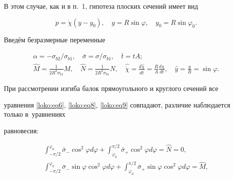 В этом случае, как и в п.~1, гипотеза плоских сечений имеет вид

\begin{equation}

\label{loko:eq11}

\dot {p}=\dot {\chi }(y-y_0),

\quad

y=R\sin \varphi,

\quad

y_0 =R\sin \varphi _0 .

\end{equation}

Введём безразмерные переменные

\begin{gather*}

\alpha =-{\sigma_{b2}}/{\sigma_{b1}}, \quad \bar {\sigma }={\sigma}/{\sigma_{b1}},

\quad \bar {t}=t A; \\

\hat {M}=\frac{1}{2R^3\sigma _{b1}} M, \quad

\hat {N}=\frac{1}{2R^2\sigma _{b1} } N,\quad 

\hat {\dot {\chi }}=\frac{d\hat {\chi }}{d\bar {t}}=\frac{R}{A}\frac{d\chi }{dt}, \quad \hat {y}=\frac{y}{R}=\sin \varphi.

\end{gather*}

При рассмотрении изгиба балок прямоугольного и круглого сечений все

уравнения \eqref{loko:eq6}, \eqref{loko:eq8}, \eqref{loko:eq9} совпадают, различие наблюдается только в~уравнениях

равновесия:

\begin{equation}

\label{loko:eq13}

\begin{array}{l}

\displaystyle

\int_{-\pi /2}^{\varphi _0} \bar {\sigma}_- \cos^2\varphi d\varphi +

\int_{\varphi _0}^{\pi /2} \bar {\sigma }_+ \cos^2\varphi d\varphi =\hat {N}=0, \\[2mm]

\displaystyle

\int_{-\pi /2}^{\varphi _0 } \bar {\sigma }_- \sin \varphi \cos^2\varphi d\varphi +

\int_{\varphi_0 }^{\pi /2} \bar {\sigma }_+   \sin \varphi \cos^2\varphi d\varphi  =\hat

{M},

\end{array}

\end{equation}

